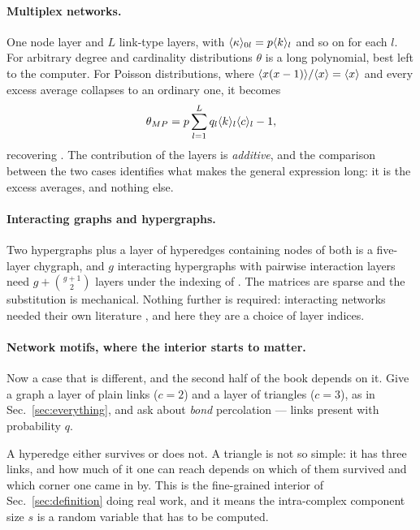 \paragraph{Multiplex networks.} One node layer and $L$ link-type layers, with
$\langle \kappa \rangle_{0l}=p\langle k \rangle_{l}$ and so on for each $l$. For arbitrary degree
and cardinality distributions $\theta$ is a long polynomial, best left to the
computer. For Poisson distributions, where $\langle x(x-1) \rangle/\langle x \rangle=\langle x \rangle$ and
every excess average collapses to an ordinary one, it becomes
\begin{equation}
  \theta_{MP}=p\sum_{l=1}^{L}q_{l}\langle k \rangle_{l}\langle c \rangle_{l}-1,
  \label{eq:thetaMP}
\end{equation}
recovering \citet{sun2021}. The contribution of the layers is
\emph{additive}, and the comparison between the two cases identifies what makes
the general expression long: it is the excess averages, and nothing else.

\paragraph{Interacting graphs and hypergraphs.} Two hypergraphs plus a layer of
hyperedges containing nodes of both is a five-layer chygraph, and $g$
interacting hypergraphs with pairwise interaction layers need
$g+\binom{g+1}{2}$ layers under the indexing of
\citet{vazquez2024comnet}. The matrices are sparse and the substitution is
mechanical. Nothing further is required: interacting
networks needed their own literature \citep{leicht2009,bianconi2017}, and here
they are a choice of layer indices.

\paragraph{Network motifs, where the interior starts to matter.} Now a case that
is different, and the second half of the book depends on it. Give a graph a layer of plain links ($c=2$) and a layer of triangles
($c=3$), as in Sec.~\ref{sec:everything}, and ask about \emph{bond}
percolation --- links present with probability $q$.

A hyperedge either survives or does not. A triangle is not so simple: it has
three links, and how much of it one can reach depends on which of them survived
and which corner one came in by. This is the fine-grained interior of
Sec.~\ref{sec:definition} doing real work, and it means the intra-complex
component size $s$ is a random variable that has to be computed.

